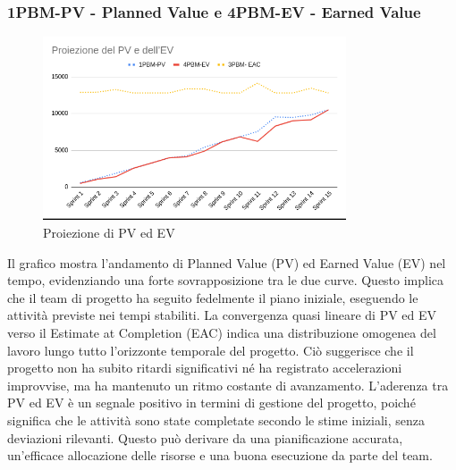 \documentclass{article}
\begin{document}
        \subsubsection{1PBM-PV - Planned Value e 4PBM-EV - Earned Value}
        \begin{figure}[H]
            \centering
            \includegraphics[width=0.8\textwidth]{../../../img/pdq_charts/chart1-proiezionePVEV.png}
            \caption{Proiezione di PV ed EV}
        \end{figure}
        Il grafico mostra l'andamento di Planned Value (PV) ed Earned Value (EV) nel tempo, evidenziando una forte sovrapposizione tra le due curve. Questo implica che il team di progetto ha seguito fedelmente il piano iniziale, eseguendo le attività previste nei tempi stabiliti.
        La convergenza quasi lineare di PV ed EV verso il Estimate at Completion (EAC) indica una distribuzione omogenea del lavoro lungo tutto l'orizzonte temporale del progetto. Ciò suggerisce che il progetto non ha subito ritardi significativi né ha registrato accelerazioni improvvise, ma ha mantenuto un ritmo costante di avanzamento.
        L'aderenza tra PV ed EV è un segnale positivo in termini di gestione del progetto, poiché significa che le attività sono state completate secondo le stime iniziali, senza deviazioni rilevanti. Questo può derivare da una pianificazione accurata, un'efficace allocazione delle risorse e una buona esecuzione da parte del team.
\end{document}
